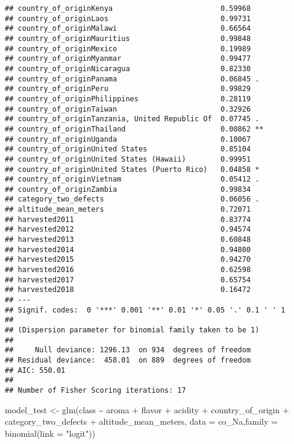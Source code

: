 \documentclass[
]{article}
\newenvironment{Shaded}{\begin{snugshade}}{\end{snugshade}}
\newcommand{\AttributeTok}[1]{\textcolor[rgb]{0.77,0.63,0.00}{#1}}
\newcommand{\FunctionTok}[1]{\textcolor[rgb]{0.00,0.00,0.00}{#1}}
\newcommand{\NormalTok}[1]{#1}
\newcommand{\OtherTok}[1]{\textcolor[rgb]{0.56,0.35,0.01}{#1}}
\newcommand{\SpecialCharTok}[1]{\textcolor[rgb]{0.00,0.00,0.00}{#1}}
\newcommand{\StringTok}[1]{\textcolor[rgb]{0.31,0.60,0.02}{#1}}
\begin{document}
\begin{verbatim}
## country_of_originKenya                         0.59968    
## country_of_originLaos                          0.99731    
## country_of_originMalawi                        0.66564    
## country_of_originMauritius                     0.99848    
## country_of_originMexico                        0.19989    
## country_of_originMyanmar                       0.99477    
## country_of_originNicaragua                     0.82330    
## country_of_originPanama                        0.06845 .  
## country_of_originPeru                          0.99829    
## country_of_originPhilippines                   0.28119    
## country_of_originTaiwan                        0.32926    
## country_of_originTanzania, United Republic Of  0.07745 .  
## country_of_originThailand                      0.00862 ** 
## country_of_originUganda                        0.10067    
## country_of_originUnited States                 0.85104    
## country_of_originUnited States (Hawaii)        0.99951    
## country_of_originUnited States (Puerto Rico)   0.04858 *  
## country_of_originVietnam                       0.05412 .  
## country_of_originZambia                        0.99834    
## category_two_defects                           0.06056 .  
## altitude_mean_meters                           0.72071    
## harvested2011                                  0.83774    
## harvested2012                                  0.94574    
## harvested2013                                  0.60848    
## harvested2014                                  0.94800    
## harvested2015                                  0.94270    
## harvested2016                                  0.62598    
## harvested2017                                  0.65754    
## harvested2018                                  0.16472    
## ---
## Signif. codes:  0 '***' 0.001 '**' 0.01 '*' 0.05 '.' 0.1 ' ' 1
## 
## (Dispersion parameter for binomial family taken to be 1)
## 
##     Null deviance: 1296.13  on 934  degrees of freedom
## Residual deviance:  458.01  on 889  degrees of freedom
## AIC: 550.01
## 
## Number of Fisher Scoring iterations: 17
\end{verbatim}

\begin{Shaded}
\begin{Highlighting}[]
\NormalTok{model\_test }\OtherTok{\textless{}{-}} \FunctionTok{glm}\NormalTok{(class }\SpecialCharTok{\textasciitilde{}}\NormalTok{ aroma }\SpecialCharTok{+}\NormalTok{ flavor }\SpecialCharTok{+}\NormalTok{ acidity }\SpecialCharTok{+}\NormalTok{ country\_of\_origin }\SpecialCharTok{+}\NormalTok{ category\_two\_defects }\SpecialCharTok{+}\NormalTok{ altitude\_mean\_meters, }\AttributeTok{data =}\NormalTok{ co\_Na,}\AttributeTok{family =} \FunctionTok{binomial}\NormalTok{(}\AttributeTok{link =} \StringTok{"logit"}\NormalTok{))}
\end{Highlighting}
\end{Shaded}
\end{document}
